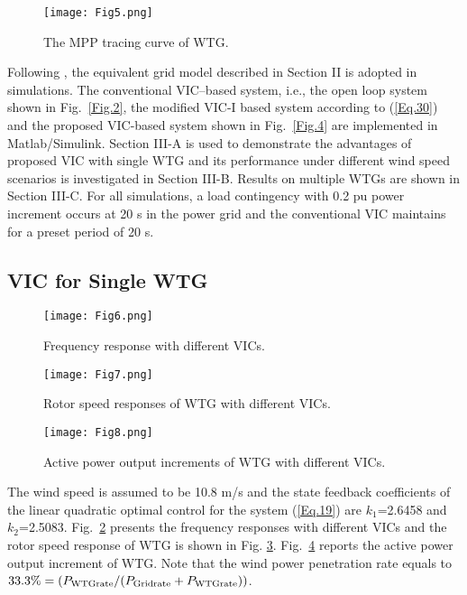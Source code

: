 \documentclass[journal]{IEEEtran}
\begin{document}
\begin{figure}
  \centering
  \texttt{[image: Fig5.png]}
  \caption{The MPP tracing curve of WTG.}
  \label{Fig.5}
\end{figure}

Following \cite{Danny2017Fast}, the equivalent grid model described in Section II is adopted in simulations.  The conventional VIC–based system, i.e., the open loop system shown in Fig.~\ref{Fig.2}, the modified VIC-I based system according to (\ref{Eq.30}) and the proposed VIC-based system shown in Fig.~\ref{Fig.4} are implemented in Matlab/Simulink.  Section III-A is used to demonstrate the advantages of proposed VIC with single WTG and its performance under different wind speed scenarios is investigated in Section III-B. Results on multiple WTGs are shown in Section III-C. For all simulations, a load contingency with 0.2 pu power increment occurs at 20 s in the power grid and the conventional VIC maintains for a preset period of 20 s.

\subsection{VIC for Single WTG}

\begin{figure}
  \centering
  \texttt{[image: Fig6.png]}
  \caption{Frequency response with different VICs.}
  \label{Fig.6}
\end{figure}
\begin{figure}
  \centering
  \texttt{[image: Fig7.png]}
  \caption{Rotor speed responses of WTG with different VICs.}
  \label{Fig.7}
\end{figure}
\begin{figure}
  \centering
  \texttt{[image: Fig8.png]}
  \caption{Active power output increments of WTG with different VICs.}
  \label{Fig.8}
\end{figure}

The wind speed is assumed to be 10.8 m/s and the state feedback coefficients of the linear quadratic optimal control for the system (\ref{Eq.19}) are $k_1$=2.6458 and $k_2$=2.5083. Fig.~\ref{Fig.6} presents the frequency responses with different VICs and the rotor speed response of WTG is shown in Fig. \ref{Fig.7}. Fig.~\ref{Fig.8} reports the active power output increment of WTG. Note that the wind power
penetration rate equals to
$33.3\% =(P_{\rm WTGrate} /(P_{\rm Gridrate} + P_{\rm WTGrate}))$.
\end{document}
